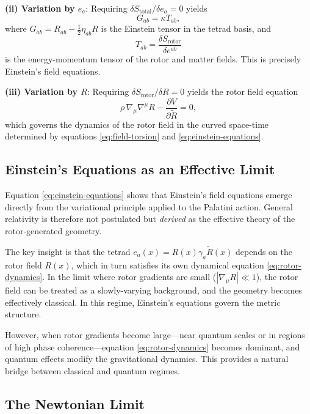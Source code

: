 \documentclass[11pt,a4paper]{article}
\numberwithin{equation}{section}
\theoremstyle{plain}
\theoremstyle{definition}
\theoremstyle{remark}
\begin{document}
\textbf{(ii) Variation by $e_a$}: Requiring $\delta S_{\mathrm{total}}/\delta e_a = 0$ yields
\begin{equation}
G_{ab} = \kappa T_{ab},
\label{eq:einstein-equations}
\end{equation}
where $G_{ab} = R_{ab} - \frac{1}{2}\eta_{ab}R$ is the Einstein tensor in the tetrad basis, and
\begin{equation}
T_{ab} = \frac{\delta S_{\mathrm{rotor}}}{\delta e^{ab}}
\end{equation}
is the energy-momentum tensor of the rotor and matter fields. This is precisely Einstein's field equations.

\textbf{(iii) Variation by $R$}: Requiring $\delta S_{\mathrm{rotor}}/\delta R = 0$ yields the rotor field equation
\begin{equation}
\rho\, \nabla_\mu \nabla^\mu R - \frac{\partial V}{\partial \widetilde{R}} = 0,
\label{eq:rotor-dynamics}
\end{equation}
which governs the dynamics of the rotor field in the curved space-time determined by equations \eqref{eq:field-torsion} and \eqref{eq:einstein-equations}.

\subsection{Einstein's Equations as an Effective Limit}

Equation \eqref{eq:einstein-equations} shows that Einstein's field equations emerge directly from the variational principle applied to the Palatini action. General relativity is therefore not postulated but \emph{derived} as the effective theory of the rotor-generated geometry.

The key insight is that the tetrad $e_a(x) = R(x)\gamma_a\widetilde{R}(x)$ depends on the rotor field $R(x)$, which in turn satisfies its own dynamical equation \eqref{eq:rotor-dynamics}. In the limit where rotor gradients are small ($|\nabla_\mu R| \ll 1$), the rotor field can be treated as a slowly-varying background, and the geometry becomes effectively classical. In this regime, Einstein's equations govern the metric structure.

However, when rotor gradients become large---near quantum scales or in regions of high phase coherence---equation \eqref{eq:rotor-dynamics} becomes dominant, and quantum effects modify the gravitational dynamics. This provides a natural bridge between classical and quantum regimes.

\subsection{The Newtonian Limit}
\end{document}
